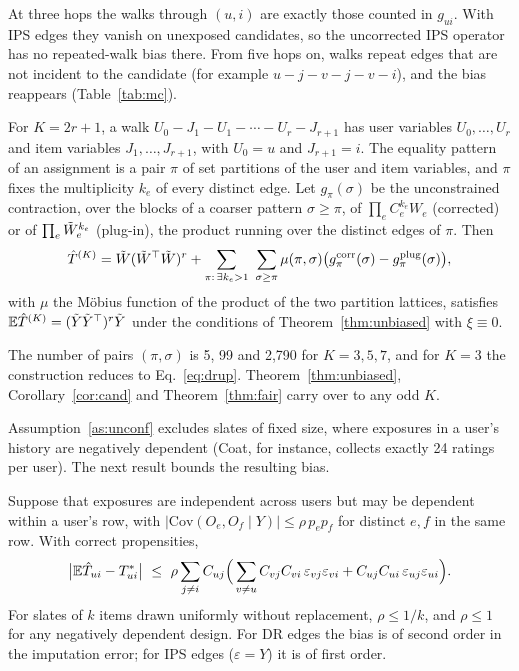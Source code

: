 At three hops the walks through $(u,i)$ are exactly those counted in
$g_{ui}$. With IPS edges they vanish on unexposed candidates, so the uncorrected
IPS operator has no repeated-walk bias there. From five hops on, walks repeat
edges that are not incident to the candidate (for example
$u\!-\!j\!-\!v\!-\!j\!-\!v\!-\!i$), and the bias reappears
(Table~\ref{tab:mc}).

\begin{theorem}\label{thm:khop}
For $K=2r+1$, a walk $U_0\!-\!J_1\!-\!U_1\!-\cdots-\!U_r\!-\!J_{r+1}$ has user
variables $U_0,\dots,U_r$ and item variables $J_1,\dots,J_{r+1}$, with $U_0=u$
and $J_{r+1}=i$. The equality pattern of an assignment is a pair $\pi$ of set
partitions of the user and item variables, and $\pi$ fixes the multiplicity
$k_e$ of every distinct edge. Let $g_\pi(\sigma)$ be the unconstrained
contraction, over the blocks of a coarser pattern $\sigma\ge\pi$, of
$\prod_eC_e^{k_e}W_e$ (corrected) or of $\prod_e\tilde W_e^{k_e}$ (plug-in), the
product running over the distinct edges of $\pi$. Then
\[
\hat T^{(K)}=\tW(\tW^\top\tW)^r+\sum_{\pi:\,\exists k_e>1}\ \sum_{\sigma\ge\pi}\mu(\pi,\sigma)\big(g^{\mathrm{corr}}_\pi(\sigma)-g^{\mathrm{plug}}_\pi(\sigma)\big),
\]
with $\mu$ the Möbius function of the product of the two partition lattices,
satisfies $\mathbb{E}\hat T^{(K)}=(\tilde Y\tilde Y^\top)^r\tilde Y$ under the conditions of
Theorem~\ref{thm:unbiased} with $\xi\equiv0$.
\end{theorem}
The number of pairs $(\pi,\sigma)$ is 5, 99 and 2{,}790 for $K=3,5,7$, and for
$K=3$ the construction reduces to Eq.~\eqref{eq:drup}. Theorem~\ref{thm:unbiased},
Corollary~\ref{cor:cand} and Theorem~\ref{thm:fair} carry over to any odd $K$.

Assumption~\ref{as:unconf} excludes slates of fixed size, where exposures in a
user's history are negatively dependent (Coat, for instance, collects exactly
24 ratings per user). The next result bounds the resulting bias.

\begin{proposition}\label{prop:dep}
Suppose that exposures are independent across users but may be dependent within
a user's row, with $|\mathrm{Cov}(O_e,O_f\mid Y)|\le\rho\,p_ep_f$ for distinct $e,f$ in
the same row. With correct propensities,
\[
\big|\E\hat T_{ui}-T^*_{ui}\big|\ \le\ \rho\sum_{j\neq i}C_{uj}\Big(\sum_{v\neq u}C_{vj}C_{vi}\,\varepsilon_{vj}\varepsilon_{vi}+C_{uj}C_{ui}\,\varepsilon_{uj}\varepsilon_{ui}\Big).
\]
For slates of $k$ items drawn uniformly without replacement, $\rho\le1/k$, and
$\rho\le1$ for any negatively dependent design. For DR edges the bias is of
second order in the imputation error; for IPS edges ($\varepsilon=Y$) it is of
first order.
\end{proposition}

